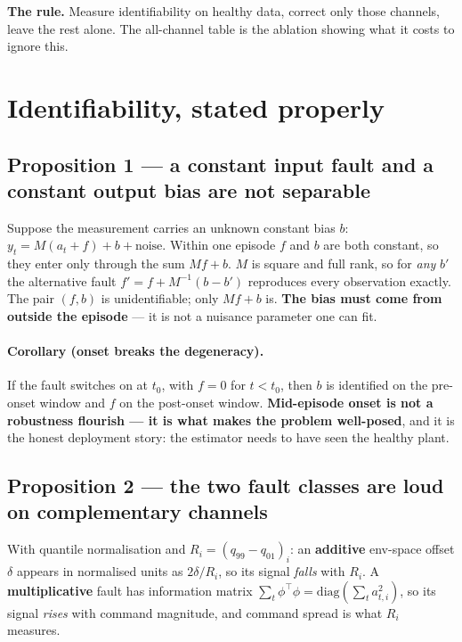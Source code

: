 \documentclass[11pt,a4paper]{article}
\begin{document}
\begin{tcolorbox}[colback=blue!4,colframe=blue!45!black]
\textbf{The rule.} Measure identifiability on healthy data, correct only those
channels, leave the rest alone. The all-channel table is the ablation showing
what it costs to ignore this.
\end{tcolorbox}

\section{Identifiability, stated properly}

\subsection{Proposition 1 --- a constant input fault and a constant output bias are not separable}

Suppose the measurement carries an unknown constant bias $b$:
$y_t = M(a_t + f) + b + \text{noise}$.
Within one episode $f$ and $b$ are both constant, so they enter only through the
sum $Mf + b$. $M$ is square and full rank, so for \emph{any} $b'$ the alternative
fault $f' = f + M^{-1}(b - b')$ reproduces every observation exactly. The pair
$(f, b)$ is unidentifiable; only $Mf + b$ is. \textbf{The bias must come from
outside the episode} --- it is not a nuisance parameter one can fit.

\paragraph{Corollary (onset breaks the degeneracy).} If the fault switches on at
$t_0$, with $f = 0$ for $t < t_0$, then $b$ is identified on the pre-onset window
and $f$ on the post-onset window. \textbf{Mid-episode onset is not a robustness
flourish --- it is what makes the problem well-posed}, and it is the honest
deployment story: the estimator needs to have seen the healthy plant.

\subsection{Proposition 2 --- the two fault classes are loud on complementary channels}

With quantile normalisation and $R_i = (q_{99}-q_{01})_i$: an \textbf{additive}
env-space offset $\delta$ appears in normalised units as $2\delta/R_i$, so its
signal \emph{falls} with $R_i$. A \textbf{multiplicative} fault has information
matrix $\sum_t \phi^\top\phi = \mathrm{diag}(\sum_t a_{t,i}^2)$, so its signal
\emph{rises} with command magnitude, and command spread is what $R_i$ measures.
\end{document}
